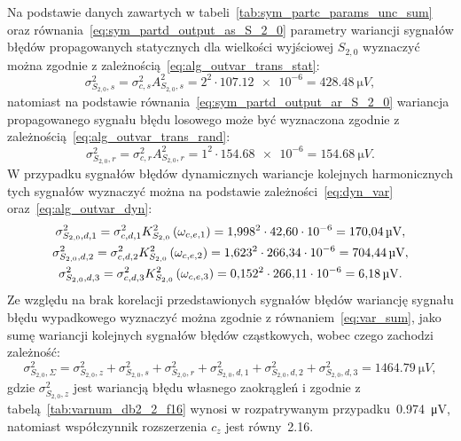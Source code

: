 Na podstawie danych zawartych w tabeli~\ref{tab:sym_partc_params_unc_sum} oraz równania~\eqref{eq:sym_partd_output_as_S_2_0} parametry wariancji sygnałów błędów propagowanych statycznych dla wielkości wyjściowej $S_{2,0}$ wyznaczyć można zgodnie z zależnością~\eqref{eq:alg_outvar_trans_stat}:
\begin{equation}
\sigma_{S_{2,0},s}^{2} = \sigma_{c,s}^{2} A_{S_{2,0},s}^{2} = 2^{2} \cdot \num{107.12e-6} = \qty{428.48}{\micro V} \label{eq:sym_partd_output_var_stat_S_2_0},
\end{equation}
natomiast na podstawie równania~\eqref{eq:sym_partd_output_ar_S_2_0} wariancja propagowanego sygnału błędu losowego może być wyznaczona zgodnie z zależnością~\eqref{eq:alg_outvar_trans_rand}:
\begin{equation}
\sigma_{S_{2,0},r}^{2} = \sigma_{c,r}^{2} A_{S_{2,0},r}^{2} = 1^{2} \cdot \num{154.68e-6} = \qty{154.68}{\micro V} \label{eq:sym_partd_output_var_rand_S_2_0}.
\end{equation}
W przypadku sygnałów błędów dynamicznych wariancje kolejnych harmonicznych tych sygnałów wyznaczyć można na podstawie zależności~\eqref{eq:dyn_var} oraz~\eqref{eq:alg_outvar_dyn}:
\begin{gather}
\sigma_{S_{2,0},d,1}^{2} = \sigma_{c,d,1}^{2} K_{S_{2,0}}^{2} \left(\omega_{c,e,1}\right) = \num{1.998}^{2} \cdot \num{42.60e-6} = \qty{170.04}{\micro V} \label{eq:sym_partd_output_var_dyn_1_S_2_0}, \\
\sigma_{S_{2,0},d,2}^{2} = \sigma_{c,d,2}^{2} K_{S_{2,0}}^{2} \left(\omega_{c,e,2}\right) = \num{1.623}^{2} \cdot \num{266.34e-6} = \qty{704.44}{\micro V} \label{eq:sym_partd_output_var_dyn_2_S_2_0}, \\
\sigma_{S_{2,0},d,3}^{2} = \sigma_{c,d,3}^{2} K_{S_{2,0}}^{2} \left(\omega_{c,e,3}\right) = \num{0.152}^{2} \cdot \num{266.11e-6} = \qty{6.18}{\micro V} \label{eq:sym_partd_output_var_dyn_3_S_2_0}.
\end{gather}
Ze względu na brak korelacji przedstawionych sygnałów błędów wariancję sygnału błędu wypadkowego wyznaczyć można zgodnie z równaniem~\eqref{eq:var_sum}, jako sumę wariancji kolejnych sygnałów błędów cząstkowych, wobec czego zachodzi zależność:
\begin{equation}
\sigma_{S_{2,0},\Sigma}^{2} = \sigma_{S_{2,0},z}^{2} + \sigma_{S_{2,0},s}^{2} + \sigma_{S_{2,0},r}^{2} + \sigma_{S_{2,0},d,1}^{2} + \sigma_{S_{2,0},d,2}^{2} + \sigma_{S_{2,0},d,3}^{2} = \qty{1464.79}{\micro V} \label{eq:sym_partd_output_var_sum_S_2_0},
\end{equation}
gdzie $\sigma_{S_{2,0},z}^{2}$ jest wariancją błędu własnego zaokrągleń i zgodnie z tabelą~\ref{tab:varnum_db2_2_f16} wynosi w rozpatrywanym przypadku~\qty{0.974}{\micro V}, natomiast współczynnik rozszerzenia $c_{z}$ jest równy~\num{2.16}.
